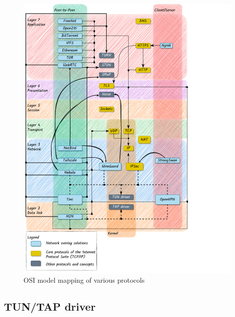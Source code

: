 \begin{figure}
\centering
\includegraphics[width=\textwidth,height=0.9\textheight]{thesis/../figures/osi-map-overlays.drawio.pdf}
\caption{OSI model mapping of various protocols
\label{osi-map-overlays}}
\end{figure}

\hypertarget{tuntap-driver}{%
\subsection{TUN/TAP driver}\label{tuntap-driver}}

